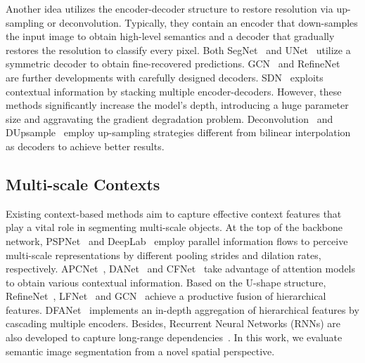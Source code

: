 \documentclass[journal]{IEEEtran}
\begin{document}
Another idea utilizes the encoder-decoder structure to restore resolution via up-sampling or deconvolution. Typically, they contain an encoder that down-samples the input image to obtain high-level semantics and a decoder that gradually restores the resolution to classify every pixel. Both SegNet~\cite{badrinarayanan2017segnet} and UNet~\cite{ronneberger2015u} utilize a symmetric decoder to obtain fine-recovered predictions. GCN~\cite{peng2017large} and RefineNet~\cite{lin2017refinenet} are further developments with carefully designed decoders. SDN~\cite{fu2019stacked} exploits contextual information by stacking multiple encoder-decoders. However, these methods significantly increase the model's depth, introducing a huge parameter size and aggravating the gradient degradation problem. Deconvolution~\cite{noh2015learning} and DUpsample~\cite{tian2019decoders} employ up-sampling strategies different from bilinear interpolation as decoders to achieve better results.

\subsection{Multi-scale Contexts}
Existing context-based methods aim to capture effective context features that play a vital role in segmenting multi-scale objects. At the top of the backbone network, PSPNet~\cite{zhao2017pyramid} and DeepLab~\cite{chen2017rethinking,chen2017deeplab,chen2018encoder} employ parallel information flows to perceive multi-scale representations by different pooling strides and dilation rates, respectively. APCNet~\cite{he2019adaptive},  DANet~\cite{fu2019dual} and CFNet~\cite{zhang2019co} take advantage of attention models to obtain various contextual information. Based on the U-shape structure, RefineNet~\cite{lin2017refinenet}, LFNet~\cite{yu2018learning} and GCN~\cite{peng2017large} achieve a productive fusion of hierarchical features.  DFANet~\cite{li2019dfanet} implements an in-depth aggregation of hierarchical features by cascading multiple encoders. Besides, Recurrent Neural Networks (RNNs) are also developed to capture long-range dependencies~\cite{shuai2016dag,fan2018multi}. In this work, we evaluate semantic image segmentation from a novel spatial perspective.
\end{document}
